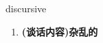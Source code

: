 
\begin{frame}
{\huge discursive}
\begin{center}
\begin{enumerate}\Large
  \item \textbf{(谈话内容)杂乱的}
\end{enumerate}
\end{center}
\end{frame}
